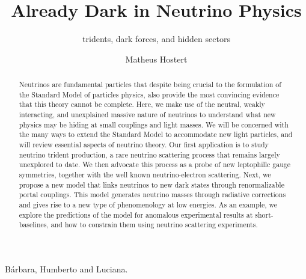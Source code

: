 \documentclass[openany,twoside,frontopenright,chaprunninghead]{ip3thesis}
\begin{document}
\title{Already Dark in Neutrino Physics}
\subtitle{tridents, dark forces, and hidden sectors}
\author{Matheus Hostert}
\maketitlepage*

\begin{abstract}
%
Neutrinos are fundamental particles that despite being crucial to the formulation of the Standard Model of particles physics, also provide the most convincing evidence that this theory cannot be complete. Here, we make use of the neutral, weakly interacting, and unexplained massive nature of neutrinos to understand what new physics may be hiding at small couplings and light masses. We will be concerned with the many ways to extend the Standard Model to accommodate new light particles, and will review essential aspects of neutrino theory. Our first application is to study neutrino trident production, a rare neutrino scattering process that remains largely unexplored to date. We then advocate this process as a probe of new leptophillc gauge symmetries, together with the well known neutrino-electron scattering. Next, we propose a new model that links neutrinos to new dark states through renormalizable portal couplings. This model generates neutrino masses through radiative corrections and gives rise to a new type of phenomenology at low energies. As an example, we explore the predictions of the model for anomalous experimental results at short-baselines, and how to constrain them using neutrino scattering experiments. 
%
\end{abstract}


\begin{dedication*}
%
B\'arbara, Humberto and Luciana.
%
\end{dedication*}

\disableprotrusion
\tableofcontents*
\listoffigures
\listoftables
\enableprotrusion
\end{document}
